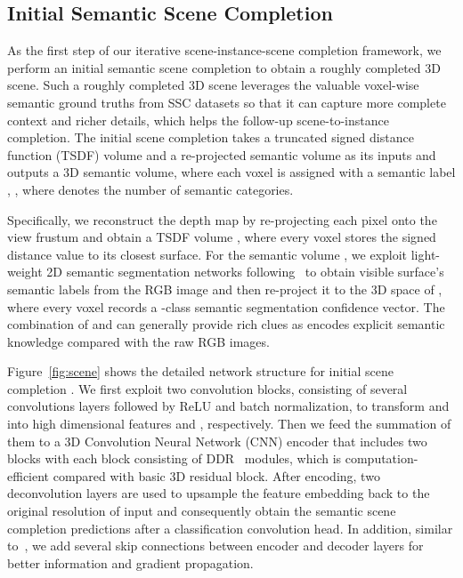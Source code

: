 \documentclass[final]{cvpr}
\begin{document}
\vspace{-0.1cm}
\subsection{Initial Semantic Scene Completion}
\vspace{-0.1cm}
As the first step of our iterative scene-instance-scene completion framework, we perform an initial semantic scene completion  to obtain a roughly completed 3D scene. Such a roughly completed 3D scene leverages the valuable voxel-wise semantic ground truths from SSC datasets so that it can capture more complete context and richer details, which helps the follow-up scene-to-instance completion.
The initial scene completion  takes a truncated signed distance function (TSDF) volume  and a re-projected semantic volume  as its inputs and outputs a 3D semantic volume, where each voxel is assigned with a semantic label , , where  denotes the number of semantic categories.

Specifically, we reconstruct the depth map by re-projecting each pixel onto the view frustum and obtain a   TSDF volume , where every voxel stores the signed distance value  to its closest surface.
For the semantic volume , we exploit light-weight 2D semantic segmentation networks following~\cite{guedes2018semantic,garbade2019two,liu2018see,li2019rgbd-ddrnet} to obtain visible surface's semantic labels from the RGB image and then re-project it to the 3D space of , where every voxel records a -class semantic segmentation confidence vector. The combination of  and  can generally provide rich clues as  encodes explicit semantic knowledge compared with the raw RGB images.


Figure~\ref{fig:scene} shows the detailed network structure for initial scene completion . We first exploit two convolution blocks, consisting of several convolutions layers followed by ReLU and batch normalization, to transform  and  into high dimensional features  and , respectively. Then we feed the summation of them to a 3D Convolution Neural Network (CNN) encoder that includes two blocks with each block consisting of  DDR~\cite{li2019rgbd-ddrnet} modules, which is computation-efficient compared with basic 3D residual block. After encoding, two deconvolution layers are used to upsample the feature embedding back to the original resolution of input and consequently obtain the semantic scene completion predictions after a classification convolution head. In addition, similar to~\cite{chen20203d}, we add several skip connections between encoder and decoder layers for better information and gradient propagation. 
\end{document}
